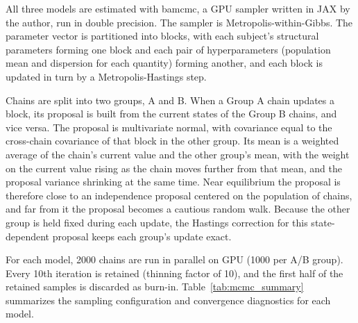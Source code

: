 \label{app:mcmc_details}

All three models are estimated with bamcmc, a GPU sampler written in JAX by
the author, run in double precision. The sampler is Metropolis-within-Gibbs.
The parameter vector is partitioned into blocks, with each subject's
structural parameters forming one block and each pair of hyperparameters
(population mean and dispersion for each quantity) forming another, and each
block is updated in turn by a Metropolis-Hastings step.

Chains are split into two groups, A and B. When a Group A chain updates a
block, its proposal is built from the current states of the Group B chains,
and vice versa. The proposal is multivariate normal, with covariance equal to
the cross-chain covariance of that block in the other group. Its mean is a
weighted average of the chain's current value and the other group's mean,
with the weight on the current value rising as the chain moves further from
that mean, and the proposal variance shrinking at the same time. Near
equilibrium the proposal is therefore close to an independence proposal
centered on the population of chains, and far from it the proposal becomes a
cautious random walk. Because the other group is held fixed during each
update, the Hastings correction for this state-dependent proposal keeps each
group's update exact.

For each model, 2000 chains are run in parallel on GPU (1000 per A/B group).
Every 10th iteration is retained (thinning factor of 10), and the first half
of the retained samples is discarded as burn-in. Table~\ref{tab:mcmc_summary}
summarizes the sampling configuration and convergence diagnostics for each
model.

